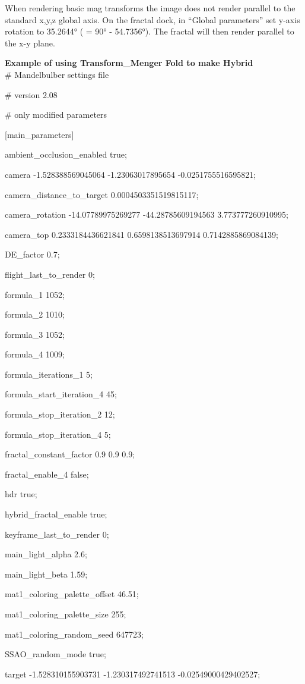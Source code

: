 When rendering basic mag transforms the image does not render parallel
to the standard x,y,z global axis. On the fractal dock, in ``Global
parameters'' set y-axis rotation to 35.2644° ( = 90° - 54.7356°). The
fractal will then render parallel to the x-y plane.

\textbf{Example of using Transform\_Menger Fold to make
Hybrid}\\[2\baselineskip]\# Mandelbulber settings file

\# version 2.08

\# only modified parameters

{[}main\_parameters{]}

ambient\_occlusion\_enabled true;

camera -1.528388569045064 -1.23063017895654 -0.0251755516595821;

camera\_distance\_to\_target 0.0004503351519815117;

camera\_rotation -14.07789975269277 -44.28785609194563
3.773777260910995;

camera\_top 0.2333184436621841 0.6598138513697914 0.7142885869084139;

DE\_factor 0.7;

flight\_last\_to\_render 0;

formula\_1 1052;

formula\_2 1010;

formula\_3 1052;

formula\_4 1009;

formula\_iterations\_1 5;

formula\_start\_iteration\_4 45;

formula\_stop\_iteration\_2 12;

formula\_stop\_iteration\_4 5;

fractal\_constant\_factor 0.9 0.9 0.9;

fractal\_enable\_4 false;

hdr true;

hybrid\_fractal\_enable true;

keyframe\_last\_to\_render 0;

main\_light\_alpha 2.6;

main\_light\_beta 1.59;

mat1\_coloring\_palette\_offset 46.51;

mat1\_coloring\_palette\_size 255;

mat1\_coloring\_random\_seed 647723;

SSAO\_random\_mode true;

target -1.528310155903731 -1.230317492741513 -0.02549000429402527;

